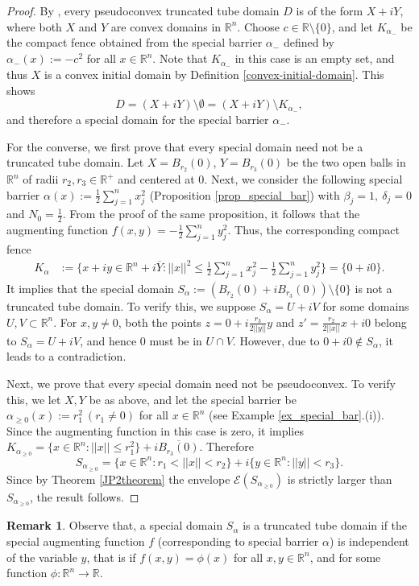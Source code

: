 \documentclass[12pt,reqno, a4paper]{amsart}
\theoremstyle{definition}
\newtheorem{remark}[theorem]{Remark}
\theoremstyle{definition}
\numberwithin{equation}{section}
\def\R{\mathbb{R}}                              %
\begin{document}
\begin{proof}
By \cite[Theorem 1.1]{egm}, every pseudoconvex truncated tube domain $D$ is of the form $X+iY$, where both $X$ and $Y$ are convex domains in $\R^n.$ Choose $c\in \R\setminus \{0\}$, and let $K_{\alpha_{-}}$ be the compact fence obtained from the special barrier $\alpha_{-}$ defined by $\alpha_{-}(x):=-c^2$ for all $x\in \R^n$. Note that $K_{\alpha_{-}}$ in this case is an empty set, and thus $X$ is a convex initial domain by Definition \ref{convex-initial-domain}. This shows $$D=(X+iY)\setminus \emptyset=(X+iY)\setminus K_{\alpha_{-}},$$ 
and therefore a special domain for the special barrier $\alpha_{-}.$


For the converse, we first prove that every special domain need not be a truncated tube domain. Let $X=B_{r_2}(0)$, $Y=B_{r_3}(0)$ be the two open balls in $ \R^n $ of radii $r_2,r_3\in \R^+$ and centered at $0.$ Next, we consider the following special barrier $\alpha(x):=\frac{1}{2}\sum_{j=1}^{n}x_j^2$ (Proposition \ref{prop_special_bar}) with $\beta_j=1,~\delta_j=0$ and $N_0=\frac{1}{2}.$ From the proof of the same proposition, it follows that the augmenting function $f(x,y)=-\frac{1}{2}\sum_{j=1}^{n}y_j^2.$ Thus, the corresponding compact fence
\begin{align*}
K_{\alpha} &:=\{x+iy \in \R^n+i \overline{Y} : ||x||^2\leq \frac{1}{2}\sum_{j=1}^{n}x_j^2-\frac{1}{2}\sum_{j=1}^{n}y_j^2\}=\{0+i0\}.
\end{align*}
It implies that the special domain $S_{\alpha}:=(B_{r_2}(0)+iB_{r_3}(0))\setminus \{0\}$ is not a truncated tube domain. To verify this, we suppose $S_{\alpha}=U+iV$ for some domains ${U,V\subset \R^n}.$ For $x,y\neq0$, both the points $z=0+i\frac{r_3}{2||y||}y$ and $z'=\frac{r_2}{2||x||}x+i0$ belong to $S_{\alpha}=U+iV$, and hence $0$ must be in $U\cap V$. However, due to $0+i0\notin S_{\alpha}$, it leads to a contradiction. 

Next, we prove that every special domain need not be pseudoconvex. To verify this, we let $X,Y$ be as above, and let the special barrier be $\alpha_{\geq0}(x):=r_1^2~(r_1\neq 0)$ for all $x\in \R^n$ (see Example \ref{ex_special_bar}.(i)). Since the augmenting function in this case is zero, it implies $K_{\alpha_{\geq0}}=\{x\in \R^n: ||x||\leq r_1^2\}+i\overline{B_{r_3}(0)}$. Therefore $$S_{\alpha_{\geq0}}=\{x \in \R^n: r_1<||x||<r_2\}+i\{y \in \R^n:||y||<r_3\}.$$
Since by Theorem \ref{JP2theorem} the envelope $\mathcal{E}(S_{\alpha_{\geq 0}})$ is strictly larger than $S_{\alpha_{\geq0}}$, the result follows. 
\end{proof}
\begin{remark}
Observe that, a special domain $S_{\alpha}$ is a truncated tube domain if the special augmenting function $f$ (corresponding to special barrier $\alpha$) is independent of the variable $y$, that is if $f(x,y)=\phi(x)$ for all $x,y\in \R^n$, and for some function $\phi:\R^n\to \R$.
\end{remark}
\end{document}
